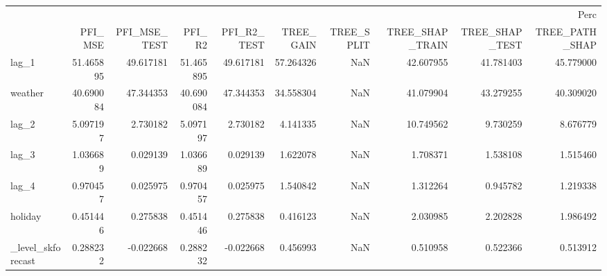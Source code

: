 \begin{tabular}{lrrrrrrrrr}
\toprule
 & \multicolumn{9}{r}{Perc} \\
 & PFI_MSE & PFI_MSE_TEST & PFI_R2 & PFI_R2_TEST & TREE_GAIN & TREE_SPLIT & TREE_SHAP_TRAIN & TREE_SHAP_TEST & TREE_PATH_SHAP \\
\midrule
lag_1 & 51.465895 & 49.617181 & 51.465895 & 49.617181 & 57.264326 & NaN & 42.607955 & 41.781403 & 45.779000 \\
weather & 40.690084 & 47.344353 & 40.690084 & 47.344353 & 34.558304 & NaN & 41.079904 & 43.279255 & 40.309020 \\
lag_2 & 5.097197 & 2.730182 & 5.097197 & 2.730182 & 4.141335 & NaN & 10.749562 & 9.730259 & 8.676779 \\
lag_3 & 1.036689 & 0.029139 & 1.036689 & 0.029139 & 1.622078 & NaN & 1.708371 & 1.538108 & 1.515460 \\
lag_4 & 0.970457 & 0.025975 & 0.970457 & 0.025975 & 1.540842 & NaN & 1.312264 & 0.945782 & 1.219338 \\
holiday & 0.451446 & 0.275838 & 0.451446 & 0.275838 & 0.416123 & NaN & 2.030985 & 2.202828 & 1.986492 \\
_level_skforecast & 0.288232 & -0.022668 & 0.288232 & -0.022668 & 0.456993 & NaN & 0.510958 & 0.522366 & 0.513912 \\
\bottomrule
\end{tabular}
